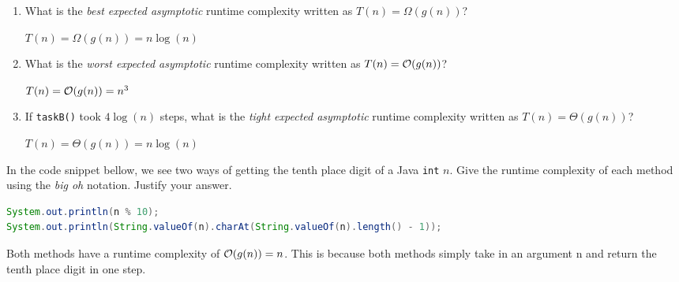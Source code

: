 \documentclass{homework}
\begin{document}
\begin{enumerate}
  \item What is the \textit{best expected asymptotic} runtime complexity
        written as $T(n) = \Omega(g(n))$?

        \begin{sol}
          $T(n) = \Omega(g(n)) = n\log(n)$
        \end{sol}

  \item What is the \textit{worst expected asymptotic} runtime complexity
        written as $T(n) = \mathcal{O}(g(n))$?

        \begin{sol}
          $T(n) = \mathcal{O}(g(n)) = n^3$
        \end{sol}
  \item If \texttt{taskB()} took $4\log(n)$ steps, what is the
        \textit{tight expected asymptotic} runtime complexity written as
        $T(n) = \Theta(g(n))$?

        \begin{sol}
          $T(n) = \Theta(g(n)) = n\log(n)$
        \end{sol}
\end{enumerate}

\question In the code snippet bellow, we see two ways of getting the tenth
place digit of a Java \texttt{int} $n$. Give the runtime
complexity of each method using the \textit{big oh} notation.
Justify your answer.
\begin{lstlisting}[language=java]
System.out.println(n % 10);
System.out.println(String.valueOf(n).charAt(String.valueOf(n).length() - 1));
\end{lstlisting}

\begin{sol}
  Both methods have a runtime complexity of $\mathcal{O}(g(n)) = n$.
  This is because both methods simply take in an argument n and return the 
  tenth place digit in one step.
\end{sol}
\end{document}
